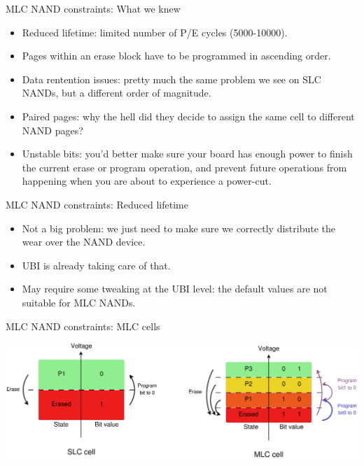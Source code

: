 \documentclass[aspectratio=169,obeyspaces,spaces,hyphens,dvipsnames]{beamer}
\begin{document}
\begin{frame}{MLC NAND constraints: What we knew}
  \begin{itemize}
  \item Reduced lifetime: limited number of P/E cycles (5000-10000).
  \item Pages within an erase block have to be programmed in ascending
	order.
  \item Data rentention issues: pretty much the same problem we see
	on SLC NANDs, but a different order of magnitude.
  \item Paired pages: why the hell did they decide to assign the same
	cell to different NAND pages?
  \item Unstable bits: you'd better make sure your board has enough
	power to finish the current erase or program operation, and
	prevent future operations from happening when you are about to
	experience a power-cut.
  \end{itemize}
\end{frame}

\begin{frame}{MLC NAND constraints: Reduced lifetime}
  \begin{itemize}
  \item Not a big problem: we just need to make sure we correctly
	distribute the wear over the NAND device.
  \item UBI is already taking care of that.
  \item May require some tweaking at the UBI level: the default values
	are not suitable for MLC NANDs.
  \end{itemize}
\end{frame}

\begin{frame}{MLC NAND constraints: MLC cells}
  \begin{center}
    \includegraphics[scale=0.2]{slc-mlc-cell.pdf}
  \end{center}
\end{frame}
\end{document}
